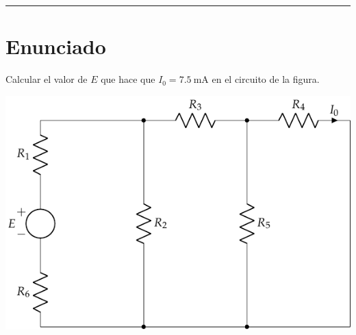   \noindent\rule{7in}{2.8pt}


  \section{Enunciado}
  Calcular el valor de $E$ que hace que $I_0=\qty{7.5}{\milli\ampere}$
  en el circuito de la figura.

  \begin{center}
    \includegraphics{figuras/BT1_03.pdf}
  \end{center}


